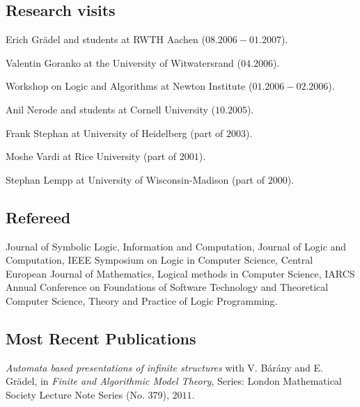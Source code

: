 \documentclass[a4paper]{article}
\begin{document}



\subsection*{Research visits} Erich Gr\"adel and students at RWTH Aachen ($08.2006-01.2007$).\

Valentin Goranko at the University of Witwatersrand ($04.2006$).\

Workshop on Logic and Algorithms at Newton Institute ($01.2006 - 02.2006$).\

Anil Nerode and students at Cornell University ($10.2005$).\

Frank Stephan at University of Heidelberg (part of $2003$).\

Moshe Vardi at Rice University (part of $2001$).\

Stephan Lempp at University of Wisconsin-Madison (part of $2000$).

\subsection*{Refereed}
{Journal of Symbolic Logic}, {Information and Computation}, {Journal of Logic and Computation}, {IEEE Symposium on Logic in Computer Science}, {Central European Journal of Mathematics}, {Logical methods in Computer Science}, {IARCS Annual Conference on
Foundations of Software Technology and Theoretical Computer Science}, {Theory and Practice of Logic Programming}.

\subsection*{Most Recent Publications}

{\it Automata based presentations of infinite structures} with V. B{\'a}r{\'a}ny and E. Gr{\"a}del,
in {\it Finite and Algorithmic Model Theory},
Series: London Mathematical Society Lecture Note Series (No. 379), $2011$.\\
\end{document}
